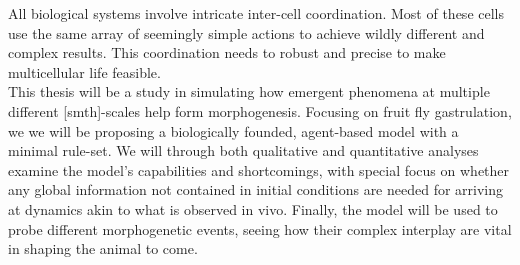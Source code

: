 All biological systems involve intricate inter-cell coordination. Most of these cells use the same array of seemingly simple actions to achieve wildly different and complex results. This coordination needs to robust and precise to make multicellular life feasible. \\

This thesis will be a study in simulating how emergent phenomena at multiple different [smth]-scales help form morphogenesis. Focusing on fruit fly gastrulation, we we will be proposing a biologically founded, agent-based model with a minimal rule-set. We will through both qualitative and quantitative analyses examine the model's capabilities and shortcomings, with special focus on whether any global information not contained in initial conditions are needed for arriving at dynamics akin to what is observed in vivo. Finally, the model will be used to probe different morphogenetic events, seeing how their complex interplay are vital in shaping the animal to come.